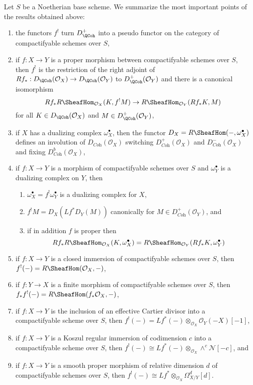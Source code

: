 \medskip\noindent
Let $S$ be a Noetherian base scheme.
We summarize the most important points of the results obtained above:
\begin{enumerate}
\item the functors $f^!$ turn $D_\QCoh^+$ into a pseudo functor
on the category of compactifyable schemes over $S$,
\item if $f : X \to Y$ is a proper morphism between compactifyable
schemes over $S$, then $f^!$ is the restriction of the right adjoint of
$Rf_* : D_\QCoh(\mathcal{O}_X) \to D_\QCoh(\mathcal{O}_Y)$
to $D_\QCoh^+(\mathcal{O}_Y)$ and there is a canonical isomorphism
$$
Rf_*R\SheafHom_{\mathcal{O}_X}(K, f^!M)
\to
R\SheafHom_{\mathcal{O}_Y}(Rf_*K, M)
$$
for all $K \in D_\QCoh(\mathcal{O}_X)$ and $M \in D_\QCoh^+(\mathcal{O}_Y)$,
\item if $X$ has a dualizing complex $\omega_X^\bullet$, then the functor
$D_X = R\SheafHom(-, \omega_X^\bullet)$
defines an involution of $D_{\textit{Coh}}(\mathcal{O}_X)$
switching $D_{\textit{Coh}}^+(\mathcal{O}_X)$ and
$D_{\textit{Coh}}^-(\mathcal{O}_X)$ and fixing
$D_{\textit{Coh}}^b(\mathcal{O}_X)$,
\item if $f : X \to Y$ is a morphism of compactifyable
schemes over $S$ and $\omega_Y^\bullet$ is a dualizing complex on $Y$,
then
\begin{enumerate}
\item $\omega_X^\bullet = f^!\omega_Y^\bullet$ is a dualizing complex for $X$,
\item $f^!M = D_X(Lf^*D_Y(M))$ canonically for
$M \in D_{\textit{Coh}}^+(\mathcal{O}_Y)$, and
\item if in addition $f$ is proper then
$$
Rf_*R\SheafHom_{\mathcal{O}_X}(K, \omega_X^\bullet) =
R\SheafHom_{\mathcal{O}_Y}(Rf_*K, \omega_Y^\bullet)
$$
\end{enumerate}
\item if $f : X \to Y$ is a closed immersion of compactifyable schemes
over $S$, then $f^!(-) = R\SheafHom(\mathcal{O}_X, -)$,
\item if $f : Y \to X$ is a finite morphism of compactifyable schemes
over $S$, then $f_*f^!(-) = R\SheafHom(f_*\mathcal{O}_X, -)$,
\item if $f : X \to Y$ is the inclusion of an effective Cartier divisor
into a compactifyable scheme over $S$, then
$f^!(-) = Lf^*(-) \otimes_{\mathcal{O}_X} \mathcal{O}_Y(-X)[-1]$,
\item if $f : X \to Y$ is a Koszul regular immersion of codimension $c$
into a compactifyable scheme over $S$, then
$f^!(-) \cong Lf^*(-) \otimes_{\mathcal{O}_X} \wedge^c\mathcal{N}[-c]$, and
\item if $f : X \to Y$ is a smooth proper morphism of relative dimension $d$
of compactifyable schemes over $S$, then
$f^!(-) \cong Lf^*  \otimes_{\mathcal{O}_X} \Omega^d_{X/Y}[d]$.
\end{enumerate}

